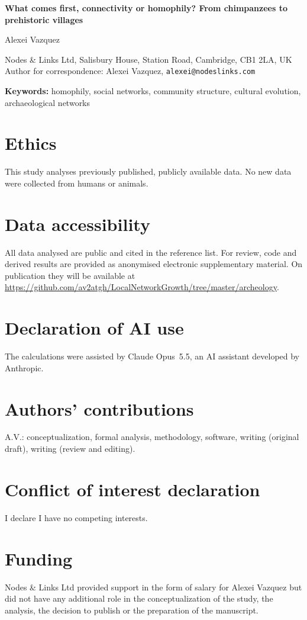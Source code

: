 \documentclass[11pt]{article}
\begin{document}
\begin{center}
{\Large\bfseries What comes first, connectivity or homophily? From chimpanzees to prehistoric villages\par}
\vspace{12pt}
{\large Alexei Vazquez\par}
\vspace{4pt}
Nodes \& Links Ltd, Salisbury House, Station Road, Cambridge, CB1 2LA, UK\\
Author for correspondence: Alexei Vazquez, \texttt{alexei@nodeslinks.com}
\end{center}

\noindent\textbf{Keywords:} homophily, social networks, community structure, cultural evolution,
archaeological networks

\section*{Ethics}
This study analyses previously published, publicly available data. No new data were collected from
humans or animals.

\section*{Data accessibility}
All data analysed are public and cited in the reference list. For review, code and derived results are
provided as anonymised electronic supplementary material. On publication they will be available at
\url{https://github.com/av2atgh/LocalNetworkGrowth/tree/master/archeology}.

\section*{Declaration of AI use}
The calculations were assisted by Claude Opus~5.5, an AI assistant developed by Anthropic.

\section*{Authors' contributions}
A.V.: conceptualization, formal analysis, methodology, software, writing (original draft), writing
(review and editing).

\section*{Conflict of interest declaration}
I declare I have no competing interests.

\section*{Funding}
Nodes \& Links Ltd provided support in the form of salary for Alexei Vazquez but did not have any
additional role in the conceptualization of the study, the analysis, the decision to publish or the
preparation of the manuscript.
\end{document}
